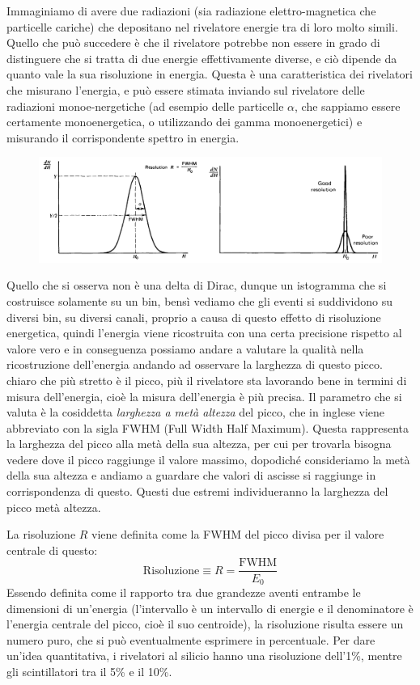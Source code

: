 Immaginiamo di avere due radiazioni (sia radiazione elettro-magnetica che particelle cariche) che depositano nel rivelatore energie tra di loro molto simili. Quello che può succedere è che il rivelatore potrebbe non essere in grado di distinguere che si tratta di due energie effettivamente diverse, e ciò dipende da quanto vale la sua risoluzione in energia. Questa è una caratteristica dei rivelatori che misurano l'energia, e può essere stimata inviando sul rivelatore delle radiazioni monoe-nergetiche (ad esempio delle particelle $\alpha$, che sappiamo essere certamente monoenergetica, o utilizzando dei gamma monoenergetici) e misurando il corrispondente spettro in energia.
\begin{figure}[H]
   \centering
   \includegraphics[width=\textwidth]{immagini/risoluzione_in_energia.png}
\end{figure}
Quello che si osserva non è una delta di Dirac, dunque un istogramma che si costruisce solamente su un bin, bensì vediamo che gli eventi si suddividono su diversi bin, su diversi canali, proprio a causa di questo effetto di risoluzione energetica, quindi l'energia viene ricostruita con una certa precisione rispetto al valore vero e in conseguenza possiamo andare a valutare la qualità nella ricostruzione dell'energia andando ad osservare la larghezza di questo picco. \E chiaro che più stretto è il picco, più il rivelatore sta lavorando bene in termini di misura dell'energia, cioè la misura dell'energia è più precisa. Il parametro che si valuta è la cosiddetta \textit{larghezza a metà altezza} del picco, che in inglese viene abbreviato con la sigla FWHM (Full Width Half Maximum). Questa rappresenta la larghezza del picco alla metà della sua altezza, per cui per trovarla bisogna vedere dove il picco raggiunge il valore massimo, dopodiché consideriamo la metà della sua altezza e andiamo a guardare che valori di ascisse si raggiunge in corrispondenza di questo. Questi due estremi individueranno la larghezza del picco metà altezza.

La risoluzione $R$ viene definita come la FWHM del picco divisa per il valore centrale di questo:
\begin{equation*}
   \text{Risoluzione}\equiv R=\frac{\text{FWHM}}{E_0}
\end{equation*}
Essendo definita come il rapporto tra due grandezze aventi entrambe le dimensioni di un'energia (l'intervallo è un intervallo di energie e il denominatore è l'energia centrale del picco, cioè il suo centroide), la risoluzione risulta essere un numero puro, che si può eventualmente esprimere in percentuale. Per dare un'idea quantitativa, i rivelatori al silicio hanno una risoluzione dell'1\%, mentre gli scintillatori tra il 5\% e il 10\%.

